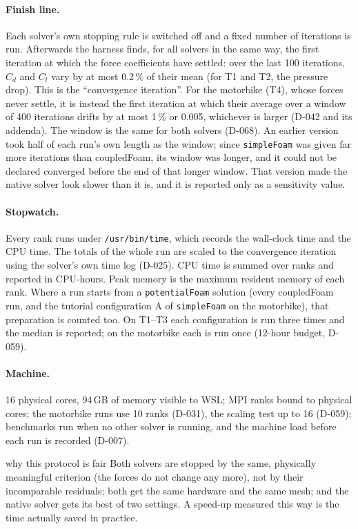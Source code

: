 \documentclass[11pt,a4paper]{article}
\newcommand{\code}[1]{\texttt{#1}}
\begin{document}
\paragraph{Finish line.} Each solver's own stopping rule is switched off and
a fixed number of iterations is run. Afterwards the harness finds, for all
solvers in the same way, the first iteration at which the force
coefficients have settled: over the last 100 iterations, $C_d$ and $C_l$
vary by at most 0.2\,\% of their mean (for T1 and T2, the pressure drop).
This is the ``convergence iteration''. For the motorbike (T4), whose
forces never settle, it is instead the first iteration at which their
average over a window of 400 iterations drifts by at most 1\,\% or 0.005,
whichever is larger (D-042 and its addenda). The window is the same for
both solvers (D-068). An earlier version took half of each run's own
length as the window; since \code{simpleFoam} was given far more
iterations than coupledFoam, its window was longer, and it could not be
declared converged before the end of that longer window. That version
made the native solver look slower than it is, and it is reported only as
a sensitivity value.

\paragraph{Stopwatch.} Every rank runs under \code{/usr/bin/time}, which
records the wall-clock time and the CPU time. The totals of the whole run
are scaled to the convergence iteration using the solver's own time log
(D-025). CPU time is summed over ranks and reported in CPU-hours. Peak
memory is the maximum resident memory of each rank. Where a run starts
from a \code{potentialFoam} solution (every coupledFoam run, and the
tutorial configuration A of \code{simpleFoam} on the motorbike), that
preparation is counted too. On T1--T3 each configuration is run three
times and the median is reported; on the motorbike each is run once
(12-hour budget, D-059).

\paragraph{Machine.} 16 physical cores, 94\,GB of memory visible to WSL; MPI
ranks bound to physical cores; the motorbike runs use 10 ranks (D-031), the
scaling test up to 16 (D-059); benchmarks run when no other solver is
running, and the machine load before each run is recorded (D-007).

\begin{whyitmatters}{why this protocol is fair}
  Both solvers are stopped by the same, physically meaningful criterion
  (the forces do not change any more), not by their incomparable residuals;
  both get the same hardware and the same mesh; and the native solver gets
  its best of two settings. A speed-up measured this way is the time
  actually saved in practice.
\end{whyitmatters}
\end{document}
